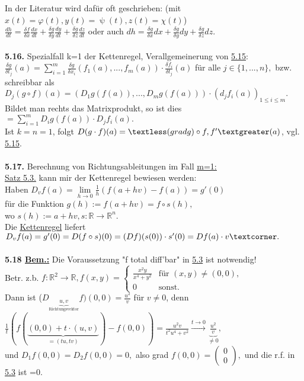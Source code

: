 \documentclass[]{scrartcl}
\begin{document}
In der Literatur wird dafür oft geschrieben: (mit 
$x(t)=\varphi(t),y(t)=\uppsi(t), z(t)=\chi(t)$)\\
$\frac{dh}{dt}=\frac{\delta f}{\delta x}\frac{d x}{d t}+\frac{\delta g}{\delta 
y}\frac{dy}{dt}+\frac{\delta g}{\delta z}\frac{dz}{dt}$ oder auch 
$dh=\frac{\delta g}{\delta x}dx+\frac{\delta g}{\delta y}dy+\frac{\delta 
g}{\delta z}dz.$\\
\\
\textbf{5.16.} Spezialfall k=1 der Kettenregel, Verallgemeinerung von 
 \ul{5.15}:\\
$\frac{\delta g}{\delta t_j}(a)=\sum_{i=1}^{m}\frac{\delta g}{\delta 
x_i}(f_1(a),...,f_m(a))\cdot\frac{\delta f_i}{\delta t_j}(a)$ für alle 
$j\in\{1,...,n\},$ bzw. schreibbar als $D_j(g\circ 
f)(a)=(D_1g(f(a)),...,D_mg(f(a)))\cdot(d_jf_i(a))_{1\leq i\leq m}.$\\
Bildet man rechts das Matrixprodukt, so ist dies $=\sum_{i=1}^{m} 
D_ig(f(a))\cdot D_jf_i(a).$\\
Ist $k=n=1$, folgt $D(g\cdot f)(a)=\textless(grad g)\circ f,f'\textgreater 
(a)$, vgl. \ul{5.15}.\\
\\
\textbf{5.17.} Berechnung von Richtungsableitungen im Fall 
\underline{\underline{m=1:}}\\
\ul{Satz 5.3.} kann mir der Kettenregel bewiesen werden:\\
\textopencorner Haben $D_vf(a)=\lim\limits_{h\rightarrow 
0}\frac{1}{h}(f(a+hv)-f(a))=g'(0)$\\
für die Funktion $g(h):=f(a+hv)=f\circ s(h),$\\
wo $s(h):=a+hv, s:\mathbb{R}\rightarrow\mathbb{R}^n.$\\
Die \ul{Kettenregel} liefert $D_vf(a)=g'(0)=D(f\circ s)(0)=(Df)(s(0))\cdot 
s'(0)=Df(a)\cdot v\textcorner.$\\
\\
\textbf{5.18 \underline{Bem.:}} Die Voraussetzung "f total diff'bar" in 
\ul{5.3} ist notwendig!\\
Betr. z.b. $f:\mathbb{R}^2\rightarrow \mathbb{R}, f(x,y)=\begin{cases}
	\frac{x^2y}{x^4+y^2} &\text{für }(x,y)\neq (0,0),\\
	0&\text{sonst.}
\end{cases}$\\
	Dann ist 
	($D_{\underbrace{u,v}_{\text{Richtungsvektor}}}f)(0,0)=\frac{u^2}{v}$ für 
	$v\neq0$, denn 
	$\frac{1}{t}(f(\underbrace{(0,0)+t\cdot(u,v)}_{=(tu,tv)})-f(0,0))= 
	\frac{u^2v}{t^2u^4+v^2} 
	\xrightarrow{t\rightarrow0}\underbrace{\frac{u^2}{v}}_{\neq 0},$\\
	und $D_1f(0,0)=D_2f(0,0)=0,$ also grad $f(0,0)=\begin{pmatrix}
		0\\0
	\end{pmatrix},$ und die r.f. in \ul{5.3} ist =0.\\
\end{document}
